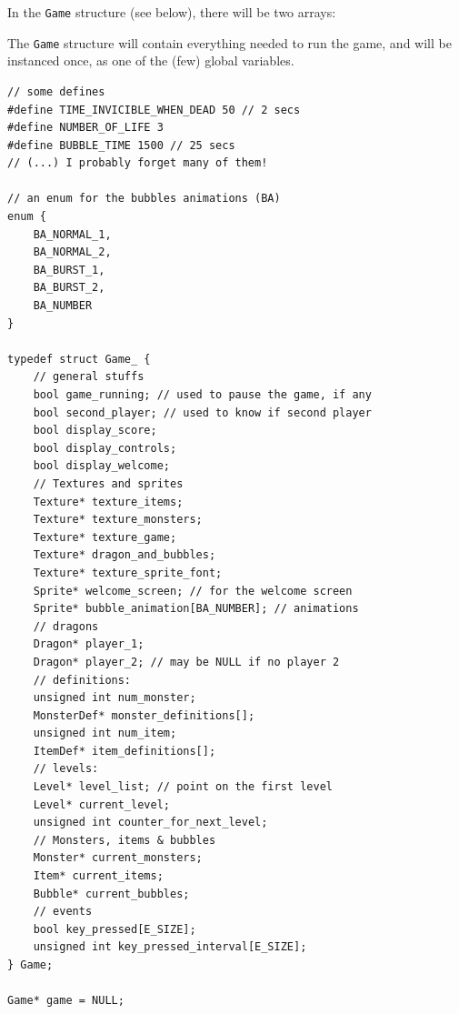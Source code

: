 \documentclass[12pt,a4paper]{article}
\begin{document}
In the \texttt{Game} structure (see below), there will be two arrays:

The \texttt{Game} structure will contain everything needed to run the game, and will be instanced once, as one of the (few) global variables.

\begin{verbatim}
// some defines
#define TIME_INVICIBLE_WHEN_DEAD 50 // 2 secs
#define NUMBER_OF_LIFE 3
#define BUBBLE_TIME 1500 // 25 secs
// (...) I probably forget many of them!

// an enum for the bubbles animations (BA)
enum {
	BA_NORMAL_1,
	BA_NORMAL_2,
	BA_BURST_1,
	BA_BURST_2,
	BA_NUMBER
}

typedef struct Game_ {
	// general stuffs
	bool game_running; // used to pause the game, if any
	bool second_player; // used to know if second player
	bool display_score;
	bool display_controls;
	bool display_welcome;
	// Textures and sprites
	Texture* texture_items;
	Texture* texture_monsters;
	Texture* texture_game;
	Texture* dragon_and_bubbles;
	Texture* texture_sprite_font;
	Sprite* welcome_screen; // for the welcome screen
	Sprite* bubble_animation[BA_NUMBER]; // animations
	// dragons
	Dragon* player_1;
	Dragon* player_2; // may be NULL if no player 2
	// definitions:
	unsigned int num_monster;
	MonsterDef* monster_definitions[];
	unsigned int num_item;
	ItemDef* item_definitions[];
	// levels:
	Level* level_list; // point on the first level
	Level* current_level;
	unsigned int counter_for_next_level;
	// Monsters, items & bubbles
	Monster* current_monsters;
	Item* current_items;
	Bubble* current_bubbles;
	// events
	bool key_pressed[E_SIZE];
	unsigned int key_pressed_interval[E_SIZE];
} Game;

Game* game = NULL;
\end{verbatim}
\end{document}
